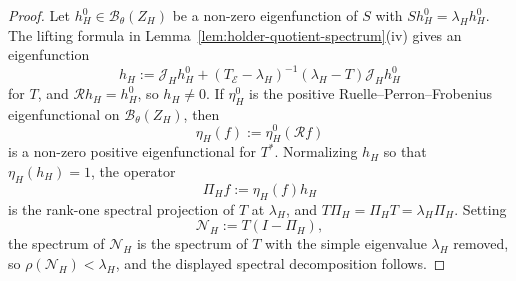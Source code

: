 \begin{proof}
Let \(h_H^0\in\mathcal B_\theta(Z_H)\) be a non-zero eigenfunction of
\(S\) with \(Sh_H^0=\lambda_Hh_H^0\).  The lifting formula in
Lemma~\ref{lem:holder-quotient-spectrum}(iv) gives an eigenfunction
\[
  h_H
  :=
  \mathcal J_Hh_H^0
  +
  (T_{\mathcal E}-\lambda_H)^{-1}
  (\lambda_H-T)\mathcal J_Hh_H^0
\]
for \(T\), and \(\mathcal R h_H=h_H^0\), so \(h_H\neq0\).  If
\(\eta_H^0\) is the positive
Ruelle--Perron--Frobenius eigenfunctional on
\(\mathcal B_\theta(Z_H)\), then
\[
  \eta_H(f):=\eta_H^0(\mathcal Rf)
\]
is a non-zero positive eigenfunctional for \(T^*\).  Normalizing
\(h_H\) so that \(\eta_H(h_H)=1\), the operator
\[
  \Pi_H f:=\eta_H(f)h_H
\]
is the rank-one spectral projection of \(T\) at \(\lambda_H\), and
\(T\Pi_H=\Pi_H T=\lambda_H\Pi_H\).  Setting
\[
  \mathcal N_H:=T(I-\Pi_H),
\]
the spectrum of \(\mathcal N_H\) is the spectrum of \(T\) with the
simple eigenvalue \(\lambda_H\) removed, so
\(\rho(\mathcal N_H)<\lambda_H\), and the displayed spectral
decomposition follows.
\end{proof}

